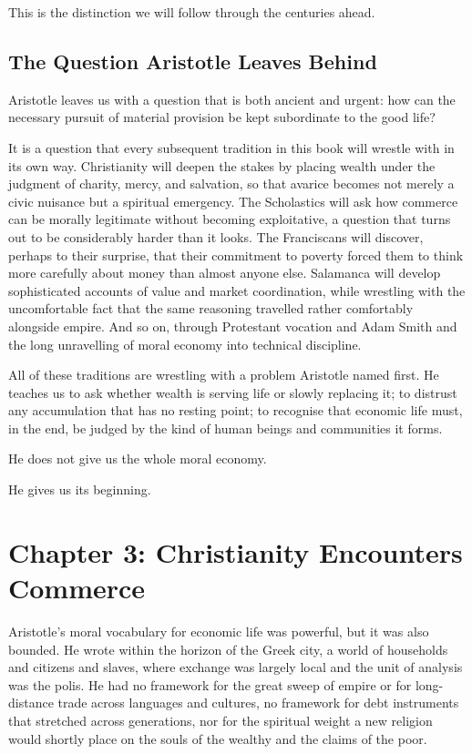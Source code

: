\documentclass[11pt,a4paper,oneside]{book}
\begin{document}
This is the distinction we will follow through the centuries ahead.

\section*{The Question Aristotle Leaves Behind}

Aristotle leaves us with a question that is both ancient and urgent: how can the necessary pursuit of material provision be kept subordinate to the good life?

It is a question that every subsequent tradition in this book will wrestle with in its own way. Christianity will deepen the stakes by placing wealth under the judgment of charity, mercy, and salvation, so that avarice becomes not merely a civic nuisance but a spiritual emergency. The Scholastics will ask how commerce can be morally legitimate without becoming exploitative, a question that turns out to be considerably harder than it looks. The Franciscans will discover, perhaps to their surprise, that their commitment to poverty forced them to think more carefully about money than almost anyone else. Salamanca will develop sophisticated accounts of value and market coordination, while wrestling with the uncomfortable fact that the same reasoning travelled rather comfortably alongside empire. And so on, through Protestant vocation and Adam Smith and the long unravelling of moral economy into technical discipline.

All of these traditions are wrestling with a problem Aristotle named first. He teaches us to ask whether wealth is serving life or slowly replacing it; to distrust any accumulation that has no resting point; to recognise that economic life must, in the end, be judged by the kind of human beings and communities it forms.

He does not give us the whole moral economy.

He gives us its beginning.

\chapter*{Chapter 3: Christianity Encounters Commerce}

Aristotle's moral vocabulary for economic life was powerful, but it was also bounded. He wrote within the horizon of the Greek city, a world of households and citizens and slaves, where exchange was largely local and the unit of analysis was the polis. He had no framework for the great sweep of empire or for long-distance trade across languages and cultures, no framework for debt instruments that stretched across generations, nor for the spiritual weight a new religion would shortly place on the souls of the wealthy and the claims of the poor.
\end{document}
